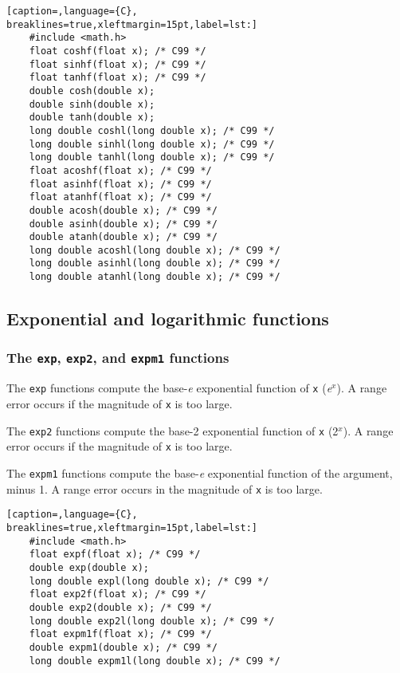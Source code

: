 \lstset{basicstyle=\scriptsize, numbers=left, captionpos=b, tabsize=4}
\begin{lstlisting}[caption=,language={C},
breaklines=true,xleftmargin=15pt,label=lst:]
	#include <math.h>
	float coshf(float x); /* C99 */
	float sinhf(float x); /* C99 */
	float tanhf(float x); /* C99 */
	double cosh(double x); 
	double sinh(double x);
	double tanh(double x);
	long double coshl(long double x); /* C99 */
	long double sinhl(long double x); /* C99 */
	long double tanhl(long double x); /* C99 */
	float acoshf(float x); /* C99 */
	float asinhf(float x); /* C99 */
	float atanhf(float x); /* C99 */
	double acosh(double x); /* C99 */
	double asinh(double x); /* C99 */
	double atanh(double x); /* C99 */
	long double acoshl(long double x); /* C99 */
	long double asinhl(long double x); /* C99 */
	long double atanhl(long double x); /* C99 */
\end{lstlisting}

\subsection{Exponential and logarithmic functions}
\subsubsection{The \texttt{exp}, \texttt{exp2}, and \texttt{expm1} functions}
The \texttt{exp} functions compute the base-\emph{e} exponential function of
\texttt{x} (\emph{e}\(^{x}\)). A range error occurs if the magnitude of
\texttt{x} is too large.

The \texttt{exp2} functions compute the base-2 exponential function of
\texttt{x} (2\(^{x}\)). A range error occurs if the magnitude of \texttt{x} is
too large.

The \texttt{expm1} functions compute the base-\emph{e} exponential function of
the argument, minus 1. A range error occurs in the magnitude of \texttt{x} is
too large.

\lstset{basicstyle=\scriptsize, numbers=left, captionpos=b, tabsize=4}
\begin{lstlisting}[caption=,language={C},
breaklines=true,xleftmargin=15pt,label=lst:]
	#include <math.h>
	float expf(float x); /* C99 */
	double exp(double x);
	long double expl(long double x); /* C99 */
	float exp2f(float x); /* C99 */
	double exp2(double x); /* C99 */
	long double exp2l(long double x); /* C99 */
	float expm1f(float x); /* C99 */
	double expm1(double x); /* C99 */
	long double expm1l(long double x); /* C99 */
\end{lstlisting}

